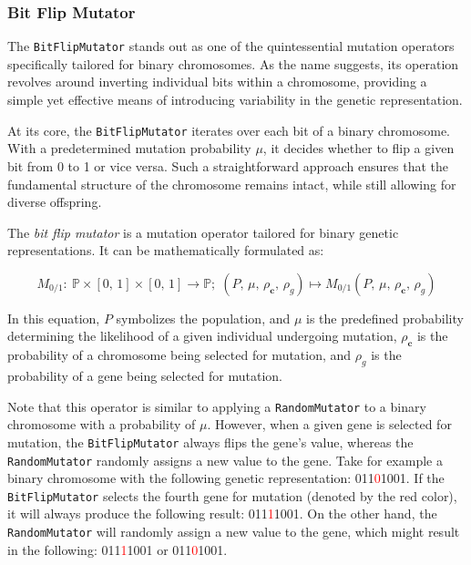 
\subsubsection{Bit Flip Mutator}
\label{sec:keen:op:mut:bit_flip}

  The \texttt{BitFlipMutator} stands out as one of the quintessential mutation 
  operators specifically tailored for binary chromosomes. As the name suggests, 
  its operation revolves around inverting individual bits within a chromosome, 
  providing a simple yet effective means of introducing variability in the 
  genetic representation.

  At its core, the \texttt{BitFlipMutator} iterates over each bit of a binary 
  chromosome. With a predetermined mutation probability \( \mu \), it decides 
  whether to flip a given bit from 0 to 1 or vice versa. Such a straightforward 
  approach ensures that the fundamental structure of the chromosome remains 
  intact, while still allowing for diverse offspring.

  \begin{definition}
    The \emph{bit flip mutator} is a mutation operator tailored for binary 
    genetic representations. It can be mathematically formulated as:

    \begin{equation}
      M_{0/1} :\: \mathbb{P} \times [0,\, 1] \times [0,\, 1] \to \mathbb{P};\;
      (P,\, \mu,\, \rho_\mathbf{c},\, \rho_g) 
        \mapsto M_{0/1}(P,\, \mu,\, \rho_\mathbf{c},\, \rho_g)
    \end{equation}

    In this equation, \(P\) symbolizes the population, and \(\mu\) is the 
    predefined probability determining the likelihood of a given individual
    undergoing mutation, \(\rho_\mathbf{c}\) is the probability of a chromosome
    being selected for mutation, and \(\rho_g\) is the probability of a gene
    being selected for mutation.
  \end{definition}

  Note that this operator is similar to applying a \texttt{RandomMutator} to a 
  binary chromosome with a probability of \(\mu\). However, when a given
  gene is selected for mutation, the \texttt{BitFlipMutator} always flips the
  gene's value, whereas the \texttt{RandomMutator} randomly assigns a new value
  to the gene. Take for example a binary chromosome with the following genetic
  representation: 011\textcolor{red}{0}1001. If the \texttt{BitFlipMutator}
  selects the fourth gene for mutation (denoted by the red color), it will
  always produce the following result: 011\textcolor{red}{1}1001. On the other
  hand, the \texttt{RandomMutator} will randomly assign a new value to the
  gene, which might result in the following: 011\textcolor{red}{1}1001 or
  011\textcolor{red}{0}1001.
